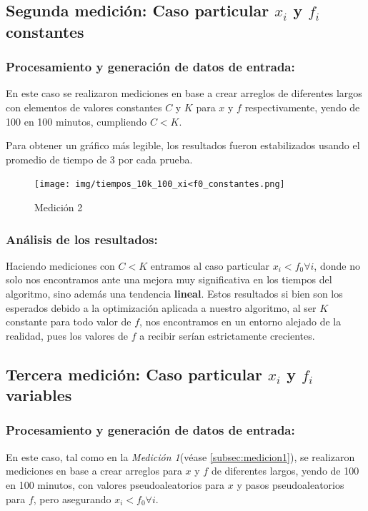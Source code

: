 \subsection{Segunda medición: Caso particular $x_i$ y $f_i$ constantes}

\subsubsection{Procesamiento y generación de datos de entrada:} 
En este caso se realizaron mediciones en base a crear arreglos de diferentes largos con elementos de valores constantes $C$ y $K$ para $x$ y $f$ respectivamente, yendo de  100 en 100 minutos, cumpliendo $C < K$.

Para obtener un gráfico más legible, los resultados fueron estabilizados usando el promedio de tiempo de 3 por cada prueba.

\begin{figure}[H]
    \centering
    \texttt{[image: img/tiempos\_10k\_100\_xi<f0\_constantes.png]}
    \caption{Medición 2}
\end{figure}

\subsubsection{Análisis de los resultados:}
Haciendo mediciones con $C < K$ entramos al caso particular $x_i < f_0\forall i $, donde no solo nos encontramos ante una mejora muy significativa en los tiempos del algoritmo, sino además una tendencia \textbf{lineal}. Estos resultados si bien son los esperados debido a la optimización aplicada a nuestro algoritmo, al ser $K$ constante para todo valor de $f$, nos encontramos en un entorno alejado de la realidad, pues los valores de $f$ a recibir serían estrictamente crecientes. 

\newpage

\subsection{Tercera medición: Caso particular $x_i$ y $f_i$ variables}

\subsubsection{Procesamiento y generación de datos de entrada:} 
En este caso, tal como en la \textit{Medición 1}(véase \ref{subsec:medicion1}), se realizaron mediciones en base a crear arreglos para $x$ y $f$ de diferentes largos, yendo de 100 en 100 minutos, con valores pseudoaleatorios para $x$ y pasos pseudoaleatorios para $f$, pero asegurando $x_i < f_0 \forall i $.

